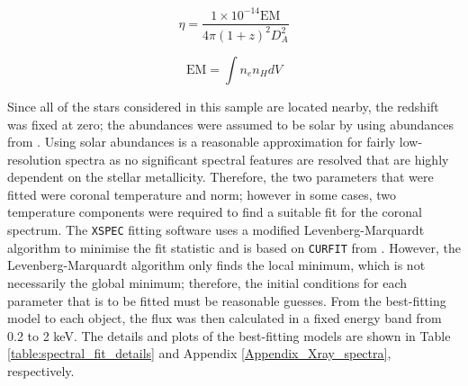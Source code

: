 \begin{equation}
    \eta = \frac{1 \times 10^{-14} \text{EM}}{4\pi(1+z)^{2}D_{A}^{2}}
    \label{Eq:norm_parameter_apec_model}
\end{equation}

\begin{equation}
    \text{EM} = \int n_{e}n_{H} dV
    \label{Eq:EM_parameter}
\end{equation}

Since all of the stars considered in this sample are located nearby, the redshift was fixed at zero; the abundances were assumed to be solar by using abundances from \citet{Grevesse_Sauval_1998}. Using solar abundances is a reasonable approximation for fairly low-resolution spectra as no significant spectral features are resolved that are highly dependent on the stellar metallicity. Therefore, the two parameters that were fitted were coronal temperature and norm; however in some cases, two temperature components were required to find a suitable fit for the coronal spectrum. The \texttt{XSPEC} fitting software uses a modified Levenberg-Marquardt algorithm to minimise the fit statistic and is based on \texttt{CURFIT} from \citet{Bevington_1969}. However, the Levenberg-Marquardt algorithm only finds the local minimum, which is not necessarily the global minimum; therefore, the initial conditions for each parameter that is to be fitted must be reasonable guesses. From the best-fitting model to each object, the flux was then calculated in a fixed energy band from 0.2 to 2 keV. The details and plots of the best-fitting models are shown in Table \ref{table:spectral_fit_details} and Appendix \ref{Appendix_Xray_spectra}, respectively.

